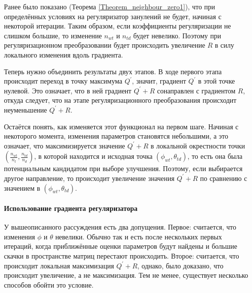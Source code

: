 \documentclass[12pt, twoside]{article}
\begin{document}
Ранее было показано (Теорема \ref{Theorem_neighbour_zero1}), что при определённых условиях на регуляризатор занулений не будет, начиная с некоторой итерации. Таким образом, если коэффициенты регуляризации не слишком большие, то изменение $n_{wt}$ и $n_{td}$ будет невелико. Поэтому при регуляризационном преобразовании будет происходить увеличение $R$ в силу локального изменения вдоль градиента.

Теперь нужно объединить результаты двух этапов. В ходе первого этапа происходит переход в точку максимума $Q^{\prime}$, значит, градиент $Q^{\prime}$ в этой точке нулевой. Это означает, что в ней градиент $Q^{\prime} +  R$ сонаправлен с градиентом $R$, откуда следует, что на этапе регуляризационного преобразования происходит неуменьшение $Q^{\prime} +  R$. 

Остаётся понять, как изменяется этот функционал на первом шаге. Начиная с некоторого момента, изменения параметров становятся небольшими, а это означает, что максимизируется значение $Q^{\prime} +  R$ в локальной окрестности точки $\left(\frac{n_{wt}}{n_t}, \frac{n_{td}}{n_d}\right)$, в которой находится и исходная точка $(\phi_{wt}, \theta_{td})$, то есть она была потенциальным кандидатом при выборе улучшения. Поэтому, если выбирается другое направление, то происходит увеличение значения $Q^{\prime} + R$ по сравнению с значением в $(\phi_{wt}, \theta_{td})$.

\paragraph{Использование градиента регуляризатора}
\label{subsec:gradientuse}
У вышеописанного рассуждения есть два допущения. Первое: считается, что изменения $\phi$ и $\theta$ невелики. Обычно так и есть после нескольких первых итераций, когда приближённые оценки параметров будут найдены и большие скачки в пространстве матриц перестают происходить. Второе: считается, что происходит локальная максимизация $Q^{\prime} + R$, однако, было доказано, что происходит увеличение, а не максимизация. Тем не менее, существует несколько способов обойти это условие. 
\end{document}
